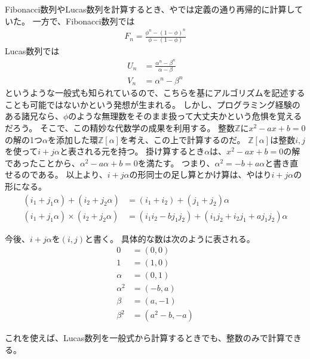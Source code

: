 Fibonacci数列やLucas数列を計算するとき、やでは定義の通り再帰的に計算していた。
一方で、Fibonacci数列では
\begin{align*}
F_n = \frac{\phi^n - (1 - \phi)^n}{\phi - (1 - \phi)}
\end{align*}
Lucas数列では
\begin{align*}
U_n &= \frac{\alpha^n - \beta^n}{\alpha - \beta}\\
V_n &= \alpha^n - \beta^n
\end{align*}
というような一般式も知られているので、こちらを基にアルゴリズムを記述することも可能ではないかという発想が生まれる。
しかし、プログラミング経験のある諸兄なら、$\phi$のような無理数をそのまま扱って大丈夫かという危惧を覚えるだろう。
そこで、この精妙な代数学の成果を利用する。
整数$\mathbb{Z}$に$x^2-ax+b=0$の解の1つ$\alpha$を添加した環$\mathbb{Z}[\alpha]$を考え、この上で計算するのだ。
$\mathbb{Z}[\alpha]$は整数$i,j$を使って$i + j\alpha$と表される元を持つ。
掛け算するとき$\alpha$は、$x^2-ax+b=0$の解であったことから、$\alpha^2-a\alpha+b=0$を満たす。
つまり、$\alpha^2=-b+a\alpha$と書き直せるのである。
以上より、$i+j\alpha$の形同士の足し算とかけ算は、やはり$i+j\alpha$の形になる。
\begin{align*}
(i_1 + j_1\alpha) + (i_2 + j_2\alpha) &= (i_1 + i_2) + (j_1 + j_2)\alpha\\
(i_1 + j_1\alpha) \times (i_2 + j_2\alpha) &= (i_1i_2 - bj_1j_2) + (i_1j_2 + i_2j_1 + aj_1j_2)\alpha
\end{align*}

今後、$i + j\alpha$を$(i,j)$と書く。
具体的な数は次のように表される。
\begin{align*}
0 &= (0, 0)\\
1 &= (1, 0)\\
\alpha &= (0, 1)\\
\alpha^2 &= (-b, a)\\
\beta &= (a, -1)\\
\beta^2 &= (a^2-b, -a)
\end{align*}

これを使えば、Lucas数列を一般式から計算するときでも、整数のみで計算できる。
